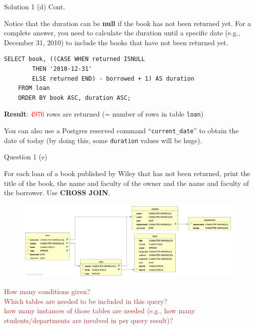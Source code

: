 \begin{frame}[fragile]{Solution 1 (d) Cont.}
	
Notice that the duration can be \textbf{null} if the book has not been returned yet. For a complete answer, you need to calculate the duration until a specific date (e.g., December 31, 2010) to include the books that have not been returned yet. \vspace{10pt}
	
\begin{lstlisting}
SELECT book, ((CASE	WHEN returned ISNULL 
		THEN '2010-12-31'
		ELSE returned END) - borrowed + 1) AS duration 
	FROM loan
	ORDER BY book ASC, duration ASC;
\end{lstlisting}
\vspace{10pt}
 
\textbf{Result}: \textcolor{red}{4976} rows are returned (= number of rows in table \texttt{loan})

\begin{exampleblock}{}
	You can also use a Postgres reserved command ``\texttt{current\_date}'' to obtain the date of today (by doing this, some \texttt{duration} values will be huge). 
\end{exampleblock}	
\end{frame}


\begin{frame}[fragile]{Question 1 (e)}

For each loan of a book published by Wiley that has not been returned, print the title of the book, the name and faculty of the owner and the name and faculty of the borrower. Use \textbf{CROSS JOIN}.

\begin{figure}
	\includegraphics[width=1\textwidth]{t1/images/t1-end.png}
\end{figure}

\textcolor{brown}{\scriptsize How many conditions given?\\
	Which tables are needed to be included in this query? \\
	how many instances of those tables are needed (e.g., how many students/departments are involved in per query result)?}
\end{frame}

